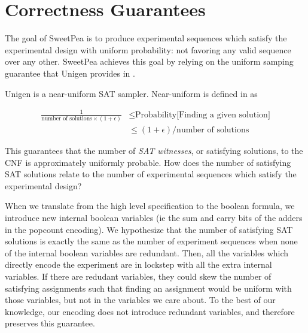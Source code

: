\section{Correctness Guarantees}

The goal of SweetPea is to produce experimental sequences which satisfy the experimental design with uniform probability: not favoring any valid sequence over any other. SweetPea achieves this goal by relying on the uniform samping guarantee that Unigen provides in \cite{chakraborty2013scalable}.

Unigen is a near-uniform SAT sampler. Near-uniform is defined in \cite{meel2016constrained} as

\begin{align*}
  \frac{1}{\text{number of solutions}\times(1+ \epsilon)} & \leq \text{Probability[Finding a given solution]} \\
  &\leq (1+\epsilon) / \text{number of solutions}
\end{align*}

This guarantees that the number of \emph{SAT witnesses}, or satisfying solutions, to the CNF is approximately uniformly probable. How does the number of satisfying SAT solutions relate to the number of experimental sequences which satisfy the experimental design?

When we translate from the high level specification to the boolean formula, we introduce new internal boolean variables (ie the sum and carry bits of the adders in the popcount encoding). We hypothesize that the number of satisfying SAT solutions is exactly the same as the number of experiment sequences when none of the internal boolean variables are redundant. Then, all the variables which directly encode the experiment are in lockstep with all the extra internal variables. If there are redudant variables, they could skew the number of satisfying assignments such that finding an assignment would be uniform with those variables, but not in the variables we care about. To the best of our knowledge, our encoding does not introduce redundant variables, and therefore preserves this guarantee.
